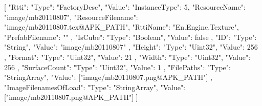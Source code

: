 [{
        "Rtti": {
            "Type": "FactoryDesc",
            "Value": {
                "InstanceType": 5,
                "ResourceName": "image/mb20110807",
                "ResourceFilename": "image/mb20110807.tex@APK_PATH",
                "RttiName": "En.Engine.Texture",
                "PrefabFilename": ""
            }
        },
        "IsCube": {
            "Type": "Boolean",
            "Value": false
        },
        "ID": {
            "Type": "String",
            "Value": "image/mb20110807"
        },
        "Height": {
            "Type": "Uint32",
            "Value": 256
        },
        "Format": {
            "Type": "Uint32",
            "Value": 21
        },
        "Width": {
            "Type": "Uint32",
            "Value": 256
        },
        "SurfaceCount": {
            "Type": "Uint32",
            "Value": 1
        },
        "FilePaths": {
            "Type": "StringArray",
            "Value": ["image/mb20110807.png@APK_PATH"]
        },
        "ImageFilenamesOfLoad": {
            "Type": "StringArray",
            "Value": ["image/mb20110807.png@APK_PATH"]
        }
    }]